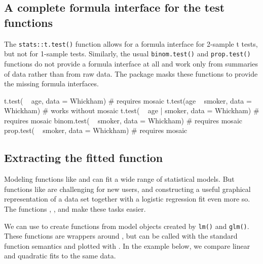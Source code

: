 \subsection{A complete formula interface for the test
functions}\label{a-complete-formula-interface-for-the-test-functions}

The \texttt{stats::t.test()} function allows for a formula interface for
2-sample t tests, but not for 1-sample tests. Similarly, the usual
\texttt{binom.test()} and \texttt{prop.test()} functions do not provide
a formula interface at all and work only from summaries of data rather
than from raw data. The  package masks these functions to
provide the missing formula interfaces.

\begin{Schunk}
\begin{Sinput}
t.test( ~ age, data = Whickham)           # requires mosaic
t.test(age ~ smoker, data = Whickham)     # works without mosaic
t.test( ~ age | smoker, data = Whickham)  # requires mosaic
binom.test( ~ smoker, data = Whickham)    # requires mosaic
prop.test( ~ smoker, data = Whickham)     # requires mosaic
\end{Sinput}
\end{Schunk}

\subsection{Extracting the fitted
function}\label{extracting-the-fitted-function}

Modeling functions like  and  can fit a wide
range of statistical models. But functions like  are
challenging for new users, and constructing a useful graphical
representation of a data set together with a logistic regression fit
even more so. The  functions ,
, and  make these tasks easier.

We can use  to create functions from model objects
created by \texttt{lm()} and \texttt{glm()}. These functions are
wrappers around , but can be called with the standard
function semantics and plotted with . In the example
below, we compare linear and quadratic fits to the same data.

